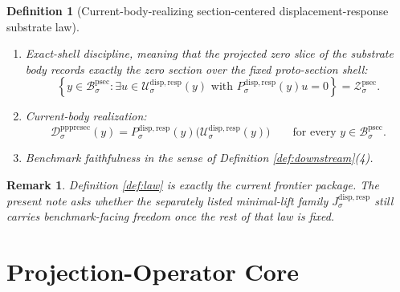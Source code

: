 \documentclass[11pt]{article}
\newcommand{\ProtoSectionBody}[1]{\mathcal B_{#1}^{\mathrm{psec}}}
\newcommand{\ProtoSectionShell}[1]{\mathcal Z_{#1}^{\mathrm{psec}}}
\newcommand{\PrePreProtoSectionVertical}[1]{V_{#1}^{\mathrm{pppresec}}}
\newcommand{\PrePreProtoSectionResidualBody}[1]{\mathcal D_{#1}^{\mathrm{pppresec}}}
\newcommand{\SubstrateCarrier}[1]{U_{#1}^{\mathrm{disp,resp}}}
\newcommand{\SubstrateBody}[1]{\mathcal U_{#1}^{\mathrm{disp,resp}}}
\newcommand{\SubstrateProjection}[1]{P_{#1}^{\mathrm{disp,resp}}}
\newcommand{\SubstrateOperator}[1]{K_{#1}^{\mathrm{disp,resp}}}
\newcommand{\SubstrateLift}[1]{J_{#1}^{\mathrm{disp,resp}}}
\newcommand{\SubstrateKernel}[1]{N_{#1}^{\mathrm{disp,resp}}}
\newtheorem{definition}{Definition}
\newtheorem{remark}{Remark}
\begin{document}
\begin{definition}[Current-body-realizing section-centered displacement-response substrate law]
\begin{enumerate}
\begin{enumerate}
\[        \SubstrateProjection{\sigma}(y)\circ\SubstrateLift{\sigma}(y)
        =
        \mathrm{id}_{\PrePreProtoSectionVertical{\sigma}};
        \]
        \item every \(u\in\SubstrateCarrier{\sigma}\) admits the unique decomposition
        \[
        u
        =
        \SubstrateLift{\sigma}(y)\bigl(\SubstrateProjection{\sigma}(y)u\bigr)
        +
        k,
        \qquad
        k\in\SubstrateKernel{\sigma}(y)\equiv\ker\SubstrateProjection{\sigma}(y);
        \]
        \item the lift is \(\SubstrateOperator{\sigma}(y)\)-orthogonal to the kernel, namely
        \[
        \ev{
        \SubstrateLift{\sigma}(y)v,
        \SubstrateOperator{\sigma}(y)k
        }
        =
        0
        \]
        for every \(v\in\PrePreProtoSectionVertical{\sigma}\) and every \(k\in\SubstrateKernel{\sigma}(y)\).
    \end{enumerate}
    \item Exact-shell discipline, meaning that the projected zero slice of the substrate body records exactly the zero section over the fixed proto-section shell:
    \[
    \left\{
    y\in\ProtoSectionBody{\sigma}:
    \exists u\in\SubstrateBody{\sigma}(y)
    \text{ with }
    \SubstrateProjection{\sigma}(y)u=0
    \right\}
    =
    \ProtoSectionShell{\sigma}.
    \]
    \item Current-body realization:
    \begin{equation}
    \PrePreProtoSectionResidualBody{\sigma}(y)
    =
    \SubstrateProjection{\sigma}(y)\bigl(\SubstrateBody{\sigma}(y)\bigr)
    \qquad
    \text{for every }
    y\in\ProtoSectionBody{\sigma}.
    \label{eq:realizing}
    \end{equation}
    \item Benchmark faithfulness in the sense of Definition \ref{def:downstream}(4).
\end{enumerate}
\end{definition}

\begin{remark}
Definition \ref{def:law} is exactly the current frontier package. The present note asks whether the separately listed minimal-lift family \(\SubstrateLift{\sigma}\) still carries benchmark-facing freedom once the rest of that law is fixed.
\end{remark}

\section{Projection-Operator Core}
\end{document}
